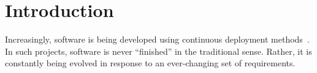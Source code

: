 \documentclass[sigconf,review,anonymous]{acmart}
\begin{document}

\renewcommand\footnotetextcopyrightpermission[1]{} %




\maketitle

\section{Introduction}
\label{sect:intro}
Increasingly,  software is being developed using   continuous deployment methods~\cite{Paasivaara18,santos2016investigating,Hohl18,Parnin17}.
In such projects, software is never ``finished'' in the traditional sense. Rather,
it is  constantly being evolved in response to an ever-changing set of
requirements. 
\end{document}
